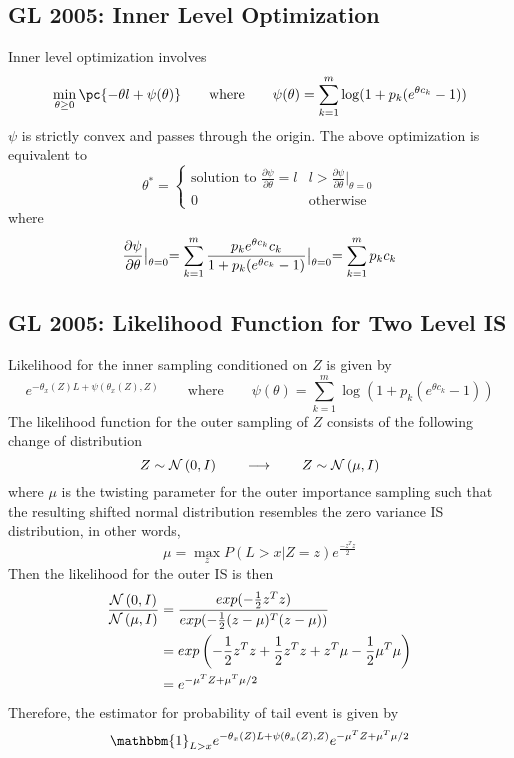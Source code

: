 \documentclass[11pt]{article}
\begin{document}
\newpage
\subsection*{GL 2005: Inner Level Optimization}

Inner level optimization involves 
\[
    \min_{\theta \geq 0} \pc{
        -\theta l + \psi(\theta)
    }
    \quad\quad
    \text{where}
    \quad\quad
    \psi(\theta) = \sum_{k=1}^m \log (1 + p_k (e^{\theta c_k} - 1))
\]
$\psi$ is strictly convex and passes through the origin. The above optimization is equivalent to 
\[
    \theta^* = 
    \begin{cases}
        \text{solution to } \frac{\partial \psi}{\partial \theta} = l & l > \frac{\partial\psi}{\partial\theta} |_{\theta=0} \\
        0 & \text{otherwise}
    \end{cases}    
\]
where
\[
    \frac{\partial\psi}{\partial\theta} \bigl\vert_{\large\theta=0}
        = \sum_{k=1}^m \frac{p_k e^{\theta c_k}  c_k}{1 + p_k (e^{\theta c_k} - 1)} \bigl\vert_{\large\theta=0}
        = \sum_{k=1}^m p_k c_k
\]


\newpage 
\subsection*{GL 2005: Likelihood Function for Two Level IS}


Likelihood for the inner sampling conditioned on $Z$ is given by 
\[
    e^{-\theta_x(Z)L + \psi(\theta_x(Z), Z)}
    \qquad \text{where} \qquad 
    \psi(\theta) = \sum_{k=1}^m \log (1 + p_k (e^{\theta c_k} - 1))
\]
The likelihood function for the outer sampling of $Z$ consists of the following change of distribution
\[
    Z \sim \mathcal{N}\left(0, I\right)    
    \qquad \longrightarrow \qquad 
    Z \sim \mathcal{N}\left(\mu, I\right)
\]
where $\mu$ is the twisting parameter for the outer importance sampling such that the resulting shifted normal distribution resembles the zero variance IS distribution, in other words,
\[
    \mu = \max_z P(L>x | Z=z) e^{\frac{-z^T z}{2}}
\]
Then the likelihood for the outer IS is then 
\begin{align*}
    \frac{\mathcal{N}\left(0, I\right)}{\mathcal{N}\left(\mu, I\right)}
    &= \frac{exp(-\frac{1}{2} z^T z)}{exp(-\frac{1}{2} (z-\mu)^T (z-\mu))} \\ 
    &= exp
    \left(
        -\frac{1}{2} z^T z + \frac{1}{2} z^T z + z^T \mu - \frac{1}{2} \mu^T \mu
    \right) \\
    &= e^{ -\mu^T Z + \mu^T \mu /2 } 
\end{align*}
Therefore, the estimator for probability of tail event is given by 
\[
    \mathbbm{1}_{L>x} e^{-\theta_x(Z)L + \psi(\theta_x(Z), Z)} e^{ -\mu^T Z + \mu^T \mu /2 }
\]
\end{document}
